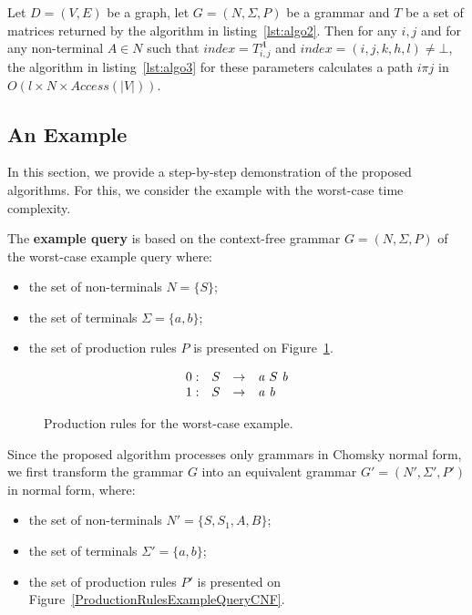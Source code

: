 \begin{mytheorem}\label{thm:time_extraction}
	Let $D = (V,E)$ be a graph, let $G =(N,\Sigma,P)$ be a grammar and $T$ be a set of matrices returned by the algorithm in listing~\ref{lst:algo2}. Then for any $i, j$ and for any non-terminal $A \in N$ such that $index = T^A_{i,j}$ and $index = (i,j,k,h,l) \neq \bot$, the algorithm in listing~\ref{lst:algo3} for these parameters calculates a path $i \pi j$ in $O(l \times N \times Access(|V|))$.
\end{mytheorem}

\subsection{An Example}
In this section, we provide a step-by-step demonstration of the proposed algorithms. For this, we consider the example with the worst-case time complexity.

The \textbf{example query} is based on the context-free grammar $G = (N, \Sigma, P)$ of the worst-case example query where:
\begin{itemize}
	\item the set of non-terminals $N = \{S\}$;
	\item the set of terminals $\Sigma = \{a, b\}$;
	\item the set of production rules $P$ is presented on Figure~\ref{ProductionRulesWorsCaseExample}.
\end{itemize}

\begin{figure}[h]
	\[
	\begin{array}{rccl}
	0: & S & \rightarrow & \text{\emph{a}} \ S \ \text{\emph{b}} \\
	1: & S & \rightarrow & \text{\emph{a}} \ \text{\emph{b}} \\ 
	\end{array}
	\]
	\caption{Production rules for the worst-case example.}
	\label{ProductionRulesWorsCaseExample}
\end{figure}

Since the proposed algorithm processes only grammars in Chomsky normal form, we first transform the grammar $G$ into an equivalent grammar $G' = (N', \Sigma', P')$ in normal form, where:
\begin{itemize}
	\item the set of non-terminals $N' = \{S, S_1, A, B\}$;
	\item the set of terminals $\Sigma' = \{a, b\}$;
	\item the set of production rules $P'$ is presented on Figure~\ref{ProductionRulesExampleQueryCNF}.
\end{itemize}

